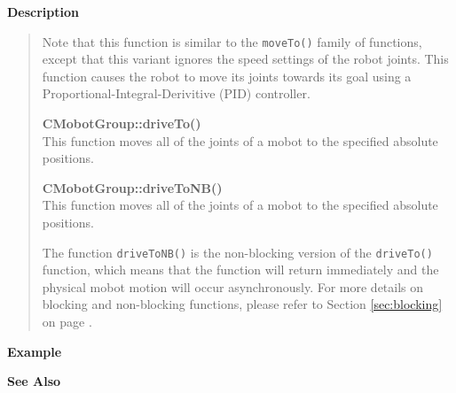 {\bf Description}\\
\vspace{-12pt}
\begin{quote}
Note that this function is similar to the \texttt{moveTo()} family of functions, except
that this variant ignores the speed settings of the robot joints. This function causes
the robot to move its joints towards its goal using a Proportional-Integral-Derivitive (PID)
controller.

{\bf CMobotGroup::driveTo()}\\
This function moves all of the joints of a mobot to the specified absolute positions. 

{\bf CMobotGroup::driveToNB()}\\
This function moves all of the joints of a mobot to the specified absolute positions. 

The function \texttt{driveToNB()} is the non-blocking version of
the \texttt{driveTo()} function, which means that the function will return
immediately and the physical mobot motion will occur asynchronously. For
more details on blocking and non-blocking functions, please refer to 
Section \ref{sec:blocking} on page \pageref{sec:blocking}.\\
\end{quote}

\noindent
{\bf Example}\\
\noindent

\noindent
{\bf See Also}\\

